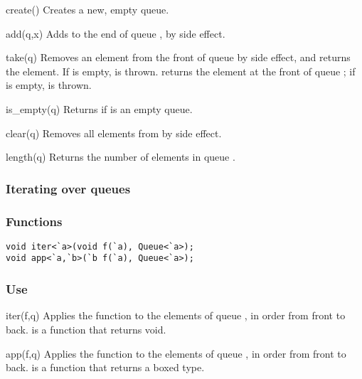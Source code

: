 \begin{defun}{create}{()}
Creates a new, empty queue.
\end{defun}

\begin{defun}{add}{(q,x)}
Adds  to the end of queue , by side effect.
\end{defun}

\begin{defun}{take}{(q)}
Removes an element from the front of queue  by side effect, and
returns the element.  If  is empty,  is thrown.
 returns the element at the front of queue ;
if  is empty,  is thrown.
\end{defun}

\begin{defun}{is_empty}{(q)}
Returns  if  is an empty queue.
\end{defun}

\begin{defun}{clear}{(q)}
Removes all elements from  by side effect.
\end{defun}

\begin{defun}{length}{(q)}
Returns the number of elements in queue .
\end{defun}

\subsubsection*{Iterating over queues}
\subsubsection*{Functions}
\begin{verbatim}
void iter<`a>(void f(`a), Queue<`a>);
void app<`a,`b>(`b f(`a), Queue<`a>);
\end{verbatim}

\subsubsection*{Use}

\begin{defun}{iter}{(f,q)}
Applies the function  to the elements of queue , in order
from front to back.   is a function that returns void.
\end{defun}

\begin{defun}{app}{(f,q)}
Applies the function  to the elements of queue , in order
from front to back.   is a function that returns a boxed type.
\end{defun}

